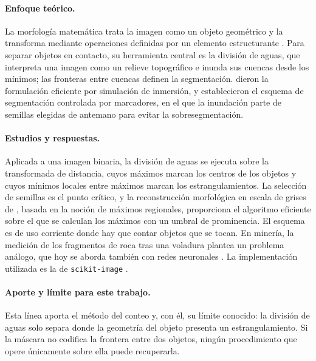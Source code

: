 \paragraph{Enfoque teórico.} La morfología matemática trata la imagen como un objeto
geométrico y la transforma mediante operaciones definidas por un elemento estructurante
\citep{soille2003morph}. Para separar objetos en contacto, su herramienta central es la
división de aguas, que interpreta una imagen como un relieve topográfico e inunda sus cuencas
desde los mínimos; las fronteras entre cuencas definen la segmentación. \citet{vincent1991watersheds}
dieron la formulación eficiente por simulación de inmersión, y \citet{meyer1990morph}
establecieron el esquema de segmentación controlada por marcadores, en el que la inundación
parte de semillas elegidas de antemano para evitar la sobresegmentación.

\paragraph{Estudios y respuestas.} Aplicada a una imagen binaria, la división de aguas se
ejecuta sobre la transformada de distancia, cuyos máximos marcan los centros de los objetos y
cuyos mínimos locales entre máximos marcan los estrangulamientos. La selección de semillas es
el punto crítico, y la reconstrucción morfológica en escala de grises de
\citet{vincent1993reconstruction}, basada en la noción de máximos regionales, proporciona el
algoritmo eficiente sobre el que se calculan los máximos con un umbral de prominencia. El
esquema es de uso corriente donde hay que contar objetos que se tocan. En minería, la medición
de los fragmentos de roca tras una voladura plantea un problema análogo, que hoy se aborda
también con redes neuronales \citep{guo2023blasted, sharifi2024fragment}. La
implementación utilizada es la de \texttt{scikit-image} \citep{vanderwalt2014skimage}.

\paragraph{Aporte y límite para este trabajo.} Esta línea aporta el método del conteo y, con
él, su límite conocido: la división de aguas solo separa donde la geometría del objeto
presenta un estrangulamiento. Si la máscara no codifica la frontera entre dos objetos, ningún
procedimiento que opere únicamente sobre ella puede recuperarla.

